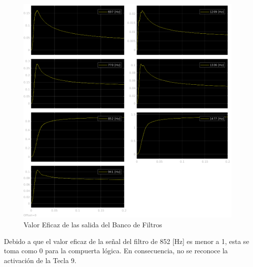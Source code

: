 \begin{figure}[H]
  \centering
  \includegraphics[width=\linewidth]{images/simulacion/fallas/rms/9.png}
  \caption{Valor Eficaz de las salida del Banco de Filtros }
  \label{fig:num_9_rms}
\end{figure}

Debido a que el valor eficaz de la señal del filtro de 852 [Hz] es menor a 1, esta se toma como 0 para la compuerta lógica. En consecuencia, no se reconoce la activación de la Tecla 9.


